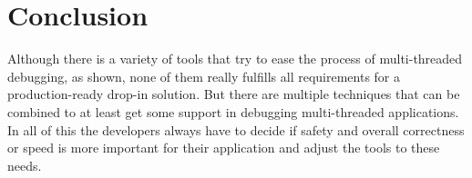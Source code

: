 \documentclass[conference]{IEEEtran}
\begin{document}
\section{Conclusion}
\label{sct:conclusion}

Although there is a variety of tools that try to ease the process of multi-threaded debugging, as shown, none of them really fulfills all requirements for a production-ready drop-in solution.
But there are multiple techniques that can be combined to at least get some support in debugging multi-threaded applications.
In all of this the developers always have to decide if safety and overall correctness or speed is more important for their application and adjust the tools to these needs.



\end{document}
